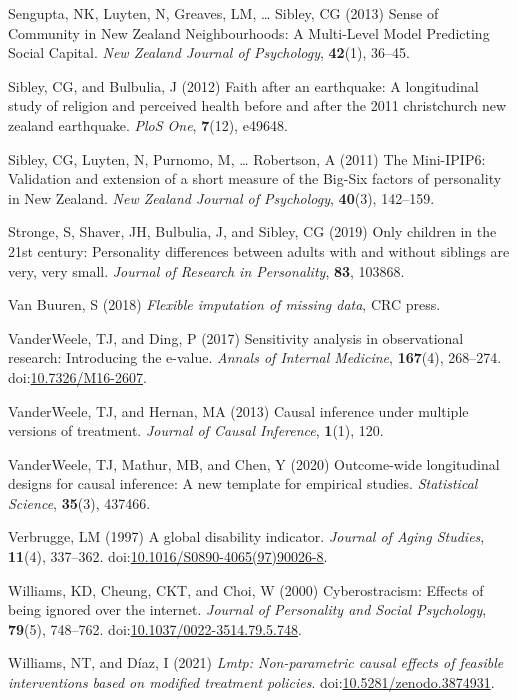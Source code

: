 \documentclass[
  singlecolumn]{article}
\newlength{\cslhangindent}
\newenvironment{CSLReferences}[2] %
 {\begin{list}{}{%
  \setlength{\itemindent}{0pt}
  \setlength{\leftmargin}{0pt}
  \setlength{\parsep}{0pt}
  \ifodd #1
   \setlength{\leftmargin}{\cslhangindent}
   \setlength{\itemindent}{-1\cslhangindent}
  \fi
  \setlength{\itemsep}{#2\baselineskip}}}
 {\end{list}}
\begin{document}
\begin{CSLReferences}{1}{0}
Sengupta, NK, Luyten, N, Greaves, LM, \ldots{} Sibley, CG (2013) Sense
of Community in New Zealand Neighbourhoods: A Multi-Level Model
Predicting Social Capital. \emph{New Zealand Journal of Psychology},
\textbf{42}(1), 36--45.

Sibley, CG, and Bulbulia, J (2012) Faith after an earthquake: A
longitudinal study of religion and perceived health before and after the
2011 christchurch new zealand earthquake. \emph{PloS One},
\textbf{7}(12), e49648.

Sibley, CG, Luyten, N, Purnomo, M, \ldots{} Robertson, A (2011) The
Mini-IPIP6: Validation and extension of a short measure of the Big-Six
factors of personality in New Zealand. \emph{New Zealand Journal of
Psychology}, \textbf{40}(3), 142--159.

Stronge, S, Shaver, JH, Bulbulia, J, and Sibley, CG (2019) Only children
in the 21st century: Personality differences between adults with and
without siblings are very, very small. \emph{Journal of Research in
Personality}, \textbf{83}, 103868.

Van Buuren, S (2018) \emph{Flexible imputation of missing data}, CRC
press.

VanderWeele, TJ, and Ding, P (2017) Sensitivity analysis in
observational research: Introducing the e-value. \emph{Annals of
Internal Medicine}, \textbf{167}(4), 268--274.
doi:\href{https://doi.org/10.7326/M16-2607}{10.7326/M16-2607}.

VanderWeele, TJ, and Hernan, MA (2013) Causal inference under multiple
versions of treatment. \emph{Journal of Causal Inference},
\textbf{1}(1), 120.

VanderWeele, TJ, Mathur, MB, and Chen, Y (2020) Outcome-wide
longitudinal designs for causal inference: A new template for empirical
studies. \emph{Statistical Science}, \textbf{35}(3), 437466.

Verbrugge, LM (1997) A global disability indicator. \emph{Journal of
Aging Studies}, \textbf{11}(4), 337--362.
doi:\href{https://doi.org/10.1016/S0890-4065(97)90026-8}{10.1016/S0890-4065(97)90026-8}.

Williams, KD, Cheung, CKT, and Choi, W (2000) Cyberostracism: Effects of
being ignored over the internet. \emph{Journal of Personality and Social
Psychology}, \textbf{79}(5), 748--762.
doi:\href{https://doi.org/10.1037/0022-3514.79.5.748}{10.1037/0022-3514.79.5.748}.

Williams, NT, and Díaz, I (2021) \emph{Lmtp: Non-parametric causal
effects of feasible interventions based on modified treatment policies}.
doi:\href{https://doi.org/10.5281/zenodo.3874931}{10.5281/zenodo.3874931}.

\end{CSLReferences}
\end{document}
